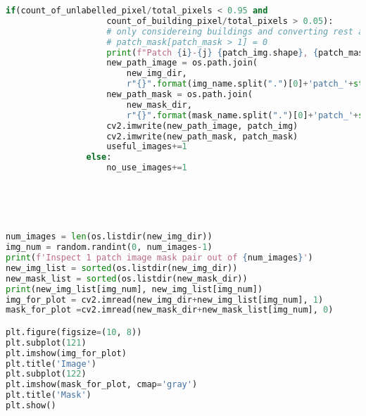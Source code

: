 \begin{lstlisting}[language=Python]
                if(count_of_unlabelled_pixel/total_pixels < 0.95 and 
                    count_of_building_pixel/total_pixels > 0.05):
                    # only considereing buildings and converting rest all to unlabelled background
                    # patch_mask[patch_mask > 1] = 0
                    print(f"Patch {i}-{j} {patch_img.shape}, {patch_mask.shape} generated")
                    new_path_image = os.path.join(
                        new_img_dir, 
                        r"{}".format(img_name.split(".")[0]+'patch_'+str(i)+str(j)+'.tif'))
                    new_path_mask = os.path.join(
                        new_mask_dir, 
                        r"{}".format(mask_name.split(".")[0]+'patch_'+str(i)+str(j)+'.tif'))
                    cv2.imwrite(new_path_image, patch_img)
                    cv2.imwrite(new_path_mask, patch_mask)
                    useful_images+=1
                else:
                    no_use_images+=1





num_images = len(os.listdir(new_img_dir))
img_num = random.randint(0, num_images-1)
print(f'Inspect 1 patch image mask pair out of {num_images}')
new_img_list = sorted(os.listdir(new_img_dir))
new_mask_list = sorted(os.listdir(new_mask_dir))
print(new_img_list[img_num], new_img_list[img_num])
img_for_plot = cv2.imread(new_img_dir+new_img_list[img_num], 1)
mask_for_plot =cv2.imread(new_mask_dir+new_mask_list[img_num], 0)

plt.figure(figsize=(10, 8))
plt.subplot(121)
plt.imshow(img_for_plot)
plt.title('Image')
plt.subplot(122)
plt.imshow(mask_for_plot, cmap='gray')
plt.title('Mask')
plt.show()


\end{lstlisting}


